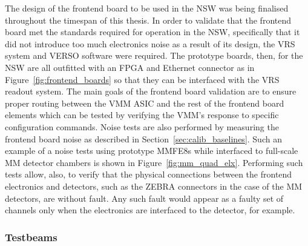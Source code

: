 The design of the frontend board to be used in the NSW was being finalised throughout the timespan
of this thesis.
In order to validate that the frontend board met the standards required for operation in the NSW, specifically
that it did not introduce too much electronics noise as a result of its design,
the VRS system and VERSO software were required.
The prototype boards, then, for the NSW are all outfitted with an FPGA and Ethernet connector as in Figure~\ref{fig:frontend_boards}
so that they can be interfaced with the VRS readout system.
The main goals of the frontend board validation are to ensure proper routing between the VMM
ASIC and the rest of the frontend board elements which can be tested by verifying the VMM's response
to specific configuration commands.
Noise tests are also performed by measuring the frontend board noise as described in Section~\ref{sec:calib_baselines}.
Such an example of a noise tests using prototype MMFE8s while interfaced to full-scale MM detector chambers
is shown in Figure~\ref{fig:mm_quad_elx}.
Performing such tests allow, also, to verify that the physical connections between the frontend electronics and detectors, such as the ZEBRA connectors in the
case of the MM detectors,
are without fault. Any such fault would appear as a faulty set of channels only when the electronics
are interfaced to the detector, for example.

\subsubsection{Testbeams}
\label{sec:verso_testbeam}

